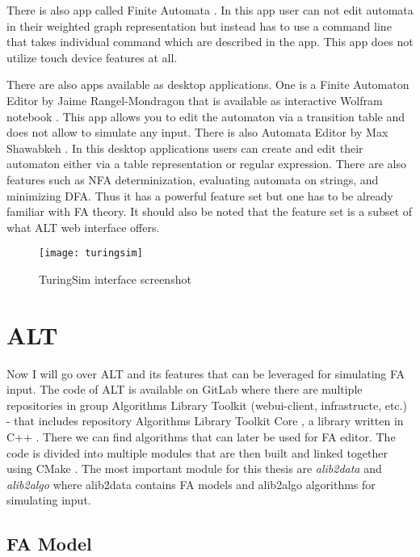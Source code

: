 There is also app called Finite Automata \cite{finite-automata-app}. In this app user can not edit automata in their weighted graph representation but instead has to use a command line that takes individual command which are described in the app. This app does not utilize touch device features at all.

There are also apps available as desktop applications. One is a Finite Automaton Editor by Jaime Rangel-Mondragon that is available as interactive Wolfram notebook \cite{wolfram-editor}. This app allows you to edit the automaton via a transition table and does not allow to simulate any input. There is also Automata Editor by Max Shawabkeh \cite{automata-editor-max}. In this desktop applications users can create and edit their automaton either via a table representation or regular expression. There are also features such as NFA determinization, evaluating automata on strings, and minimizing DFA. Thus it has a powerful feature set but one has to be already familiar with FA theory. It should also be noted that the feature set is a subset of what ALT web interface offers.

\begin{figure}
    \texttt{[image: turingsim]}
    \caption{TuringSim interface screenshot}\label{turingsim-screen}
\end{figure}

\section{ALT}

Now I will go over ALT and its features that can be leveraged for simulating FA input. The code of ALT is available on GitLab \cite{gitlab} where there are multiple repositories in group Algorithms Library Toolkit (webui-client, infrastructe, etc.) - that includes repository Algorithms Library Toolkit Core \cite{alt-code}, a library written in C++ \cite{c++}. There we can find algorithms that can later be used for FA editor. The code is divided into multiple modules that are then built and linked together using CMake \cite{cmake}. The most important module for this thesis are \textit{alib2data} and \textit{alib2algo} where alib2data contains FA models and alib2algo algorithms for simulating input.

\subsection{FA Model}

